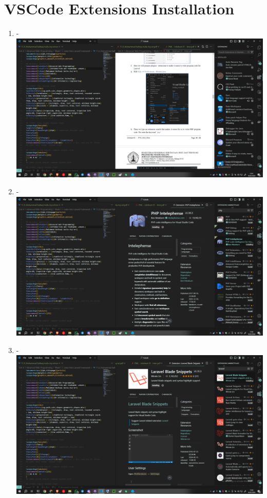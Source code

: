 \documentclass[12pt,titlepage]{article}
\begin{document}
\section{VSCode Extensions Installation}

\begin{enumerate}[label= \alph*.]
    \item - \\ \includegraphics[width=.9\textwidth]{images/figures/VSCode 1.png}
    \item - \\ \includegraphics[width=.9\textwidth]{images/figures/VSCode 2.png}
    \newpage
    \item - \\ \includegraphics[width=.9\textwidth]{images/figures/VSCode 3.png}

\end{enumerate}
\end{document}
